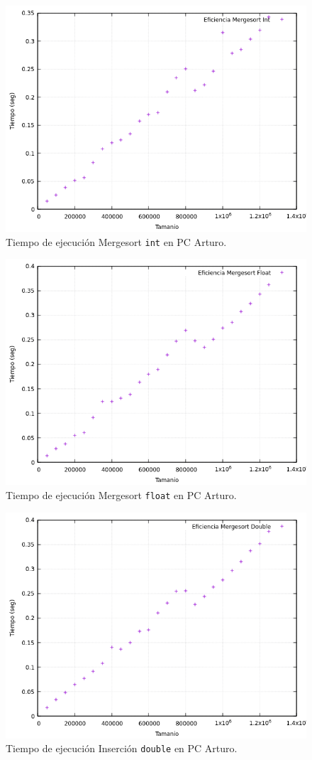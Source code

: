 \documentclass[12pt]{article}
\begin{document}
    \begin{figure}
        \centering
        \includegraphics[width=0.8\linewidth]{images/Mergesort/Mergesort_Int_Graf.png}
        \cprotect\caption{Tiempo de ejecución Mergesort \verb|int| en PC Arturo.}
        \label{fig:Mergesort_int_graf}
    \end{figure}
    \begin{figure}
        \centering
        \includegraphics[width=0.8\linewidth]{images/Mergesort/Mergesort_Flt_Graf.png}
        \cprotect\caption{Tiempo de ejecución Mergesort \verb|float| en PC Arturo.}
        \label{fig:Mergesort_float_graf}
    \end{figure}
    \begin{figure}
        \centering
        \includegraphics[width=0.8\linewidth]{images/Mergesort/Mergesort_Dbl_Graf.png}
        \cprotect\caption{Tiempo de ejecución Inserción \verb|double| en PC Arturo.}
        \label{fig:Mergesort_double_graf}
    \end{figure}
\end{document}
